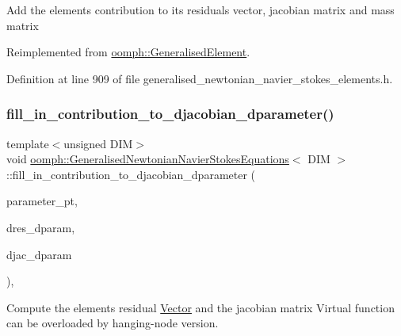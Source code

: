Add the element\textquotesingle{}s contribution to its residuals vector, jacobian matrix and mass matrix 

Reimplemented from \hyperlink{classoomph_1_1GeneralisedElement_a2d6e3c918ebc1f270eebdf4eb1027093}{oomph\+::\+Generalised\+Element}.



Definition at line 909 of file generalised\+\_\+newtonian\+\_\+navier\+\_\+stokes\+\_\+elements.\+h.

\mbox{\label{classoomph_1_1GeneralisedNewtonianNavierStokesEquations_a8b9b51442b6209405de77a0edca19c9b}} 
\subsubsection{\texorpdfstring{fill\+\_\+in\+\_\+contribution\+\_\+to\+\_\+djacobian\+\_\+dparameter()}{fill\_in\_contribution\_to\_djacobian\_dparameter()}}
{\footnotesize\ttfamily template$<$unsigned D\+IM$>$ \\
void \hyperlink{classoomph_1_1GeneralisedNewtonianNavierStokesEquations}{oomph\+::\+Generalised\+Newtonian\+Navier\+Stokes\+Equations}$<$ D\+IM $>$\+::fill\+\_\+in\+\_\+contribution\+\_\+to\+\_\+djacobian\+\_\+dparameter (\begin{DoxyParamCaption}\item[{double $\ast$const \&}]{parameter\+\_\+pt,  }\item[{\hyperlink{classoomph_1_1Vector}{Vector}$<$ double $>$ \&}]{dres\+\_\+dparam,  }\item[{\hyperlink{classoomph_1_1DenseMatrix}{Dense\+Matrix}$<$ double $>$ \&}]{djac\+\_\+dparam }\end{DoxyParamCaption})\hspace{0.3cm}{\ttfamily [inline]}, {\ttfamily [virtual]}}



Compute the element\textquotesingle{}s residual \hyperlink{classoomph_1_1Vector}{Vector} and the jacobian matrix Virtual function can be overloaded by hanging-\/node version. 



